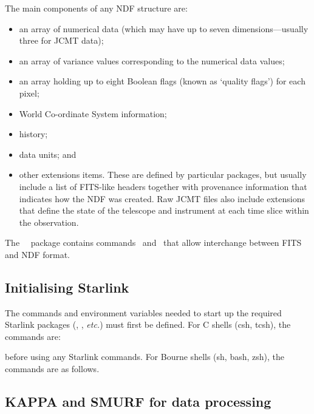 The main components of any NDF structure are:
\begin{itemize}
\item an array of numerical data (which may have up to seven
dimensions---usually three for JCMT data);
\item an array of variance values corresponding to the numerical data
values;
\item an array holding up to eight Boolean flags (known as `quality
flags') for each pixel;
\item World Co-ordinate System information;
\item history;
\item data units; and
\item other extensions items. These are defined by particular packages,
but usually include a list of FITS-like headers together with provenance
information that indicates how the NDF was created. Raw JCMT files also
include extensions that define the state of the telescope and instrument
at each time slice within the observation.
\end{itemize}

The \starlink\ \convert\ package contains commands \fitstondf\ and
\ndftofits\ that allow interchange between FITS and NDF format.

\subsection{Initialising Starlink}
\label{sec:starinit}

The commands and environment variables needed to start up the required
Starlink packages (\smurf \cite{smurf}, \Kappa, \emph{etc.}) must first
be defined. For C shells (csh, tcsh), the commands are:

\begin{terminalv}
\end{terminalv}

before using any Starlink commands. For Bourne shells (sh, bash, zsh), the commands are
as follows.

\begin{terminalv}
\end{terminalv}

\subsection{KAPPA and SMURF for data processing}
\label{sec:packinit}

